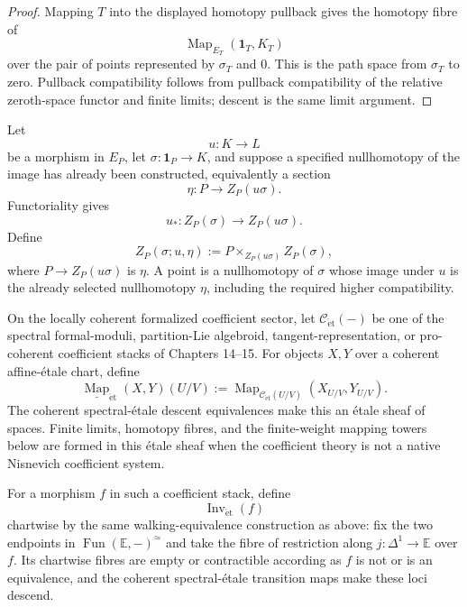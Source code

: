 \begin{proof}
Mapping $T$ into the displayed homotopy pullback gives the homotopy fibre of
\[
\operatorname{Map}_{E_T}(\mathbf1_T,K_T)
\]
over the pair of points represented by $\sigma_T$ and $0$.  This is the path
space from $\sigma_T$ to zero.  Pullback compatibility follows from pullback
compatibility of the relative zeroth-space functor and finite limits; descent is
the same limit argument.
\end{proof}

\begin{construction}
\label{constr:symmetry-noether-compatible-nullification-over-a-prescribed-image-homotopy}
Let
\[
u:K\longrightarrow L
\]
be a morphism in $E_P$, let $\sigma:\mathbf1_P\to K$, and suppose a specified
nullhomotopy of the image has already been constructed, equivalently a section
\[
\eta:P\longrightarrow Z_P(u\sigma).
\]
Functoriality gives
\[
u_*:Z_P(\sigma)\longrightarrow Z_P(u\sigma).
\]
Define
\[
\boxed{
Z_P(\sigma;u,\eta)
:=
P\times_{Z_P(u\sigma)}Z_P(\sigma),
}
\]
where $P\to Z_P(u\sigma)$ is $\eta$.
A point is a nullhomotopy of $\sigma$ whose image under $u$ is the already
selected nullhomotopy $\eta$, including the required higher compatibility.
\end{construction}

\begin{construction}
\label{constr:symmetry-noether-coherent-spectral-etale-mapping-and-equivalence-sheaves}
On the locally coherent formalized coefficient sector, let
$\mathcal C_{\mathrm{\acute et}}(-)$ be one of the spectral formal-moduli,
partition-Lie algebroid, tangent-representation, or pro-coherent coefficient
stacks of Chapters 14--15.  For objects $X,Y$ over a coherent affine-\'etale chart,
define
\[
\underline{\operatorname{Map}}_{\mathrm{\acute et}}(X,Y)(U/V)
:=
\operatorname{Map}_{\mathcal C_{\mathrm{\acute et}}(U/V)}(X_{U/V},Y_{U/V}).
\]
The coherent spectral-\'etale descent equivalences make this an \'etale sheaf of
spaces.  Finite limits, homotopy fibres, and the finite-weight mapping towers below
are formed in this \'etale sheaf when the coefficient theory is not a native
Nisnevich coefficient system.

For a morphism $f$ in such a coefficient stack, define
\[
\operatorname{Inv}_{\mathrm{\acute et}}(f)
\]
chartwise by the same walking-equivalence construction as above: fix the two
endpoints in $\operatorname{Fun}(\mathbb E,-)^\simeq$ and take the fibre of
restriction along $j:\Delta^1\to\mathbb E$ over $f$.  Its chartwise fibres are
empty or contractible according as $f$ is not or is an equivalence, and the
coherent spectral-\'etale transition maps make these loci descend.
\end{construction}

